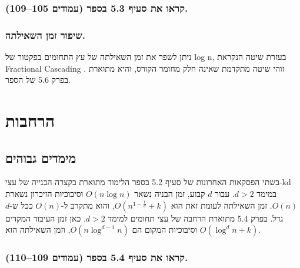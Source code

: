 \documentclass[
]{book}
\begin{document}
\hypertarget{ux5e7ux5e8ux5d0ux5d5-ux5d0ux5ea-ux5e1ux5e2ux5d9ux5e3-5.3-ux5d1ux5e1ux5e4ux5e8-ux5e2ux5deux5d5ux5d3ux5d9ux5dd-105109.}{%
\subsubsection*{קראו את סעיף 5.3 בספר (עמודים 105--109).}\label{ux5e7ux5e8ux5d0ux5d5-ux5d0ux5ea-ux5e1ux5e2ux5d9ux5e3-5.3-ux5d1ux5e1ux5e4ux5e8-ux5e2ux5deux5d5ux5d3ux5d9ux5dd-105109.}}

\hypertarget{ux5e9ux5d9ux5e4ux5d5ux5e8-ux5d6ux5deux5df-ux5d4ux5e9ux5d0ux5d9ux5dcux5eaux5d4.}{%
\subsubsection*{שיפור זמן השאילתה.}\label{ux5e9ux5d9ux5e4ux5d5ux5e8-ux5d6ux5deux5df-ux5d4ux5e9ux5d0ux5d9ux5dcux5eaux5d4.}}

ניתן לשפר את זמן השאילתה של עץ התחומים בפקטור של log n, בעזרת שיטה הנקראת Fractional Cascading . זוהי שיטה מתקדמת שאינה חלק מחומר הקורס, והיא מתוארת בפרק 5.6 של הספר.

\hypertarget{extensions}{%
\section{הרחבות}\label{extensions}}

\hypertarget{higher-dim}{%
\subsection{מימדים גבוהים}\label{higher-dim}}

בשתי הפסקאות האחרונות של סעיף 5.2 בספר הלימוד מתוארת בקצרה הבנייה של עצי-kd במימד \(d>2\). עבור \(d\) קבוע, זמן הבניה נשאר \(O( n \log n)\) וסיבוכיות הזיכרון נשארת \(O( n)\). זמן השאילתה לעומת זאת הוא \(O( n^{1-\frac{1}{d}}+k)\), והוא מתקרב ל-\(O( n)\) ככל ש-\(d\) גדל. בפרק 5.4 מתוארת הרחבה של עצי תחומים למימד \(d>2\). כאן זמן העיבוד המקדים וסיבוכיות המקום הם \(O( n \log^{d-1} n)\), וזמן השאילתה הוא \(O( \log^d n +k)\).

\hypertarget{ux5e7ux5e8ux5d0ux5d5-ux5d0ux5ea-ux5e1ux5e2ux5d9ux5e3-5.4-ux5d1ux5e1ux5e4ux5e8-ux5e2ux5deux5d5ux5d3ux5d9ux5dd-109110.}{%
\subsubsection*{קראו את סעיף 5.4 בספר (עמודים 109--110).}\label{ux5e7ux5e8ux5d0ux5d5-ux5d0ux5ea-ux5e1ux5e2ux5d9ux5e3-5.4-ux5d1ux5e1ux5e4ux5e8-ux5e2ux5deux5d5ux5d3ux5d9ux5dd-109110.}}
\end{document}
